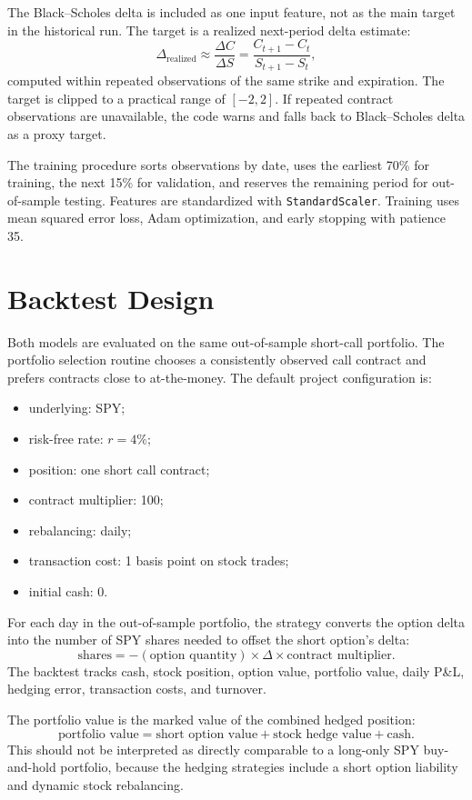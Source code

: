\documentclass[11pt]{article}
\begin{document}
The Black--Scholes delta is included as one input feature, not as the main target
in the historical run. The target is a realized next-period delta estimate:
\[
    \Delta_{\mathrm{realized}}
    \approx
    \frac{\Delta C}{\Delta S}
    =
    \frac{C_{t+1}-C_t}{S_{t+1}-S_t},
\]
computed within repeated observations of the same strike and expiration. The
target is clipped to a practical range of $[-2,2]$. If repeated contract
observations are unavailable, the code warns and falls back to Black--Scholes
delta as a proxy target.

The training procedure sorts observations by date, uses the earliest 70\% for
training, the next 15\% for validation, and reserves the remaining period for
out-of-sample testing. Features are standardized with \texttt{StandardScaler}.
Training uses mean squared error loss, Adam optimization, and early stopping
with patience 35.

\section*{Backtest Design}

Both models are evaluated on the same out-of-sample short-call portfolio. The
portfolio selection routine chooses a consistently observed call contract and
prefers contracts close to at-the-money. The default project configuration is:
\begin{itemize}
    \item underlying: SPY;
    \item risk-free rate: $r=4\%$;
    \item position: one short call contract;
    \item contract multiplier: 100;
    \item rebalancing: daily;
    \item transaction cost: 1 basis point on stock trades;
    \item initial cash: 0.
\end{itemize}

For each day in the out-of-sample portfolio, the strategy converts the option
delta into the number of SPY shares needed to offset the short option's delta:
\[
    \text{shares} =
    -(\text{option quantity}) \times \Delta \times \text{contract multiplier}.
\]
The backtest tracks cash, stock position, option value, portfolio value, daily
P\&L, hedging error, transaction costs, and turnover.

The portfolio value is the marked value of the combined hedged position:
\[
    \text{portfolio value}
    =
    \text{short option value}
    +
    \text{stock hedge value}
    +
    \text{cash}.
\]
This should not be interpreted as directly comparable to a long-only SPY
buy-and-hold portfolio, because the hedging strategies include a short option
liability and dynamic stock rebalancing.
\end{document}
